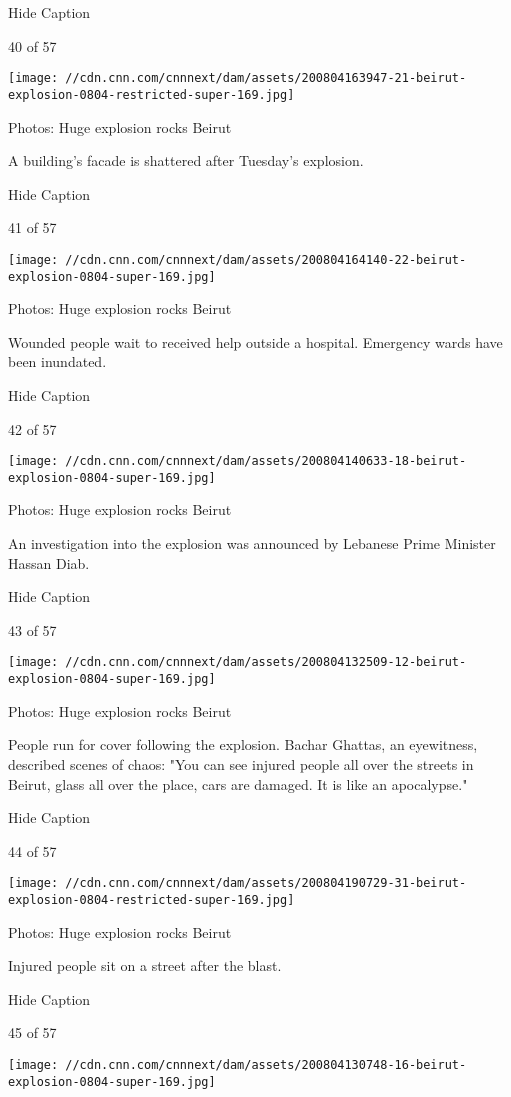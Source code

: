 Hide Caption

40 of 57

\texttt{[image: //cdn.cnn.com/cnnnext/dam/assets/200804163947-21-beirut-explosion-0804-restricted-super-169.jpg]}

Photos: Huge explosion rocks Beirut

A building's facade is shattered after Tuesday's explosion.

Hide Caption

41 of 57

\texttt{[image: //cdn.cnn.com/cnnnext/dam/assets/200804164140-22-beirut-explosion-0804-super-169.jpg]}

Photos: Huge explosion rocks Beirut

Wounded people wait to received help outside a hospital. Emergency wards
have been inundated.

Hide Caption

42 of 57

\texttt{[image: //cdn.cnn.com/cnnnext/dam/assets/200804140633-18-beirut-explosion-0804-super-169.jpg]}

Photos: Huge explosion rocks Beirut

An investigation into the explosion was announced by Lebanese Prime
Minister Hassan Diab.

Hide Caption

43 of 57

\texttt{[image: //cdn.cnn.com/cnnnext/dam/assets/200804132509-12-beirut-explosion-0804-super-169.jpg]}

Photos: Huge explosion rocks Beirut

People run for cover following the explosion. Bachar Ghattas, an
eyewitness, described scenes of chaos: "You can see injured people all
over the streets in Beirut, glass all over the place, cars are damaged.
It is like an apocalypse."

Hide Caption

44 of 57

\texttt{[image: //cdn.cnn.com/cnnnext/dam/assets/200804190729-31-beirut-explosion-0804-restricted-super-169.jpg]}

Photos: Huge explosion rocks Beirut

Injured people sit on a street after the blast.

Hide Caption

45 of 57

\texttt{[image: //cdn.cnn.com/cnnnext/dam/assets/200804130748-16-beirut-explosion-0804-super-169.jpg]}

